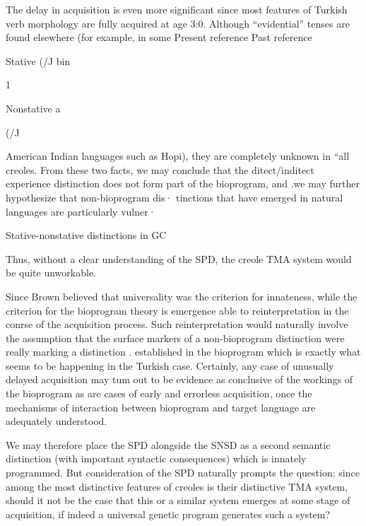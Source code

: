The delay in acquisition is even more significant since most features of Turkish verb morphology are fully acquired at age 3:0. Although ``evidential'' tenses are found elsewhere (for example, in some
Present reference Past reference

Stative (/J bin

\begin{table}
\caption{1}
\label{tab:3}
\end{table}

Nonstative a

(/J

American Indian languages such as Hopi), they are completely un\-known in ``all creoles. From these two facts, we may conclude that the ditect/inditect experience distinction does not form part of the bio\-program, and .we may further hypothesize that non-bioprogram dis· tinctions that have emerged in natural languages are particularly vulner·

Stative-nonstative distinctions in GC

Thus, without a clear understanding of the SPD, the creole TMA system would be quite unworkable.

Since Brown believed that universality was the criterion for innateness, while the criterion for the bioprogram theory is emergence
able to reinterpretation in the conrse of the acquisition process. Such reinterpretation would naturally involve the assumption that the
surface markers of a non-bioprogram distinction were really marking a distinction . established in the bioprogram which is exactly what seems to be happening in the Turkish case. Certainly, any case of unusually delayed acquisition may tum out to be evidence as conclusive
of the workings of the bioprogram as are cases of early and errorless acquisition, once the mechanisms of interaction between bioprogram and target language are adequately understood.

We may therefore place the SPD alongside the SNSD as a second
semantic distinction (with important syntactic consequences) which is innately programmed. But consideration of the SPD naturally prompts the question: since among the most distinctive features of creoles is their distinctive TMA system, should it not be the case that this or a similar system emerges at some stage of acquisition, if indeed a uni\-versal genetic program generates such a system?

